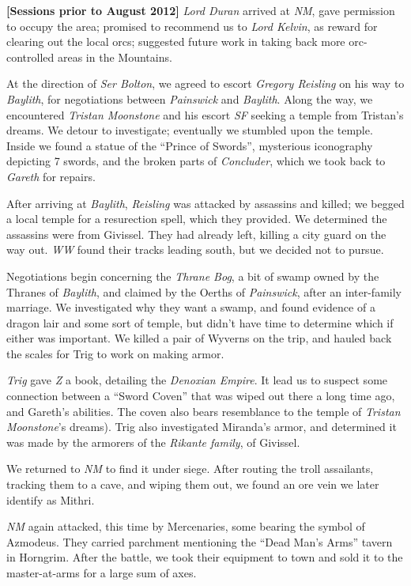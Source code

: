 \documentclass[letterpaper]{article}
\begin{document}
\noindent\textbf{[Sessions prior to August 2012]} \emph{Lord Duran} arrived at \emph{NM}, gave permission to occupy the area; promised to recommend us to \emph{Lord Kelvin}, as reward for clearing out the local orcs; suggested future work in taking back more orc-controlled areas in the Mountains. \par
At the direction of \emph{Ser Bolton}, we agreed to escort \emph{Gregory Reisling} on his way to \emph{Baylith}, for negotiations between \emph{Painswick} and \emph{Baylith}.  Along the way, we encountered \emph{Tristan Moonstone} and his escort \emph{SF} seeking a temple from Tristan's dreams. We detour to investigate; eventually we stumbled upon the temple.  Inside we found a statue of the ``Prince of Swords'', mysterious iconography depicting 7 swords, and the broken parts of \emph{Concluder}, which we took back to \emph{Gareth} for repairs.\par
After arriving at \emph{Baylith}, \emph{Reisling} was attacked by assassins and killed; we begged a local temple for a resurection spell, which they provided. We determined the assassins were from Givissel. They had already left, killing a city guard on the way out.  \emph{WW} found their tracks leading south, but we decided not to pursue.\par
Negotiations begin concerning the \emph{Thrane Bog}, a bit of swamp owned by the Thranes of \emph{Baylith}, and claimed by the Oerths of \emph{Painswick}, after an inter-family marriage.  We investigated why they want a swamp, and found evidence of a dragon lair and some sort of temple, but didn't have time to determine which if either was important.  We killed a pair of Wyverns on the trip, and hauled back the scales for Trig to work on making armor.\par
\emph{Trig} gave \emph{Z} a book, detailing the \emph{Denoxian Empire}. It lead us to suspect some connection between a ``Sword Coven'' that was wiped out there a long time ago, and Gareth's abilities. The coven also bears resemblance to the temple of \emph{Tristan Moonstone}'s dreams). Trig also investigated Miranda's armor, and determined it was made by the armorers of the \emph{Rikante family}, of Givissel.\par
We returned to \emph{NM} to find it under siege. After routing the troll assailants, tracking them to a cave, and wiping them out, we found an ore vein we later identify as Mithri.\par
\emph{NM} again attacked, this time by Mercenaries, some bearing the symbol of Azmodeus.  They carried parchment mentioning the ``Dead Man's Arms'' tavern in Horngrim.  After the battle, we took their equipment to town and sold it to the master-at-arms for a large sum of axes.\\
\end{document}
